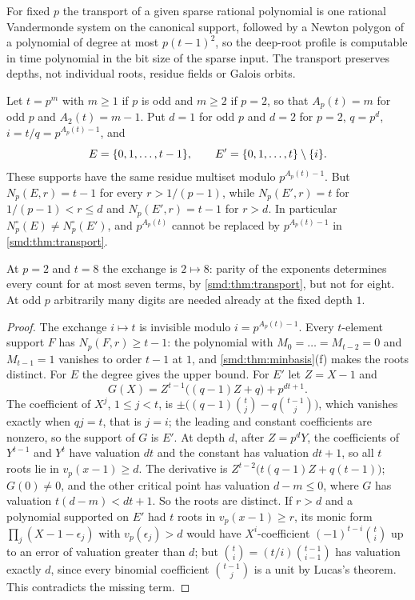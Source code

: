 For fixed $p$ the transport of a given sparse rational polynomial is one rational Vandermonde
system on the canonical support, followed by a Newton polygon of a polynomial of degree at most
$p(t-1)^2$, so the deep-root profile is computable in time polynomial in the bit size of the
sparse input. The transport preserves depths, not individual roots, residue fields or Galois
orbits.

\begin{theorem}\label{smd:thm:digits}
Let $t=p^m$ with $m\ge1$ if $p$ is odd and $m\ge2$ if $p=2$, so that $A_p(t)=m$ for odd $p$ and
$A_2(t)=m-1$. Put $d=1$ for odd $p$ and $d=2$ for $p=2$, $q=p^d$, $i=t/q=p^{A_p(t)-1}$, and
\[
 E=\{0,1,\dots,t-1\},\qquad E'=\{0,1,\dots,t\}\setminus\{i\}.
\]
These supports have the same residue multiset modulo $p^{A_p(t)-1}$. But $N_p(E,r)=t-1$ for every
$r>1/(p-1)$, while $N_p(E',r)=t$ for $1/(p-1)<r\le d$ and $N_p(E',r)=t-1$ for $r>d$. In
particular $N^\circ_p(E)\ne N^\circ_p(E')$, and $p^{A_p(t)}$ cannot be replaced by
$p^{A_p(t)-1}$ in \cref{smd:thm:transport}.
\end{theorem}

At $p=2$ and $t=8$ the exchange is $2\mapsto8$: parity of the exponents determines every count
for at most seven terms, by \cref{smd:thm:transport}, but not for eight. At odd $p$ arbitrarily
many digits are needed already at the fixed depth $1$.

\begin{proof}
The exchange $i\mapsto t$ is invisible modulo $i=p^{A_p(t)-1}$. Every $t$-element support $F$ has
$N_p(F,r)\ge t-1$: the polynomial with $M_0=\dots=M_{t-2}=0$ and $M_{t-1}=1$ vanishes to order
$t-1$ at $1$, and \cref{smd:thm:minbasis}(f) makes the roots distinct. For $E$ the degree gives
the upper bound. For $E'$ let $Z=X-1$ and
\[
 G(X)=Z^{t-1}\bigl((q-1)Z+q\bigr)+p^{dt+1}.
\]
The coefficient of $X^j$, $1\le j<t$, is $\pm\bigl((q-1)\binom tj-q\binom{t-1}j\bigr)$, which
vanishes exactly when $qj=t$, that is $j=i$; the leading and constant coefficients are nonzero,
so the support of $G$ is $E'$. At depth $d$, after $Z=p^dY$, the coefficients of $Y^{t-1}$ and
$Y^t$ have valuation $dt$ and the constant has valuation $dt+1$, so all $t$ roots lie in
$v_p(x-1)\ge d$. The derivative is $Z^{t-2}\bigl(t(q-1)Z+q(t-1)\bigr)$; $G(0)\ne0$, and the other
critical point has valuation $d-m\le0$, where $G$ has valuation $t(d-m)<dt+1$. So the roots are
distinct. If $r>d$ and a polynomial supported on $E'$ had $t$ roots in $v_p(x-1)\ge r$, its
monic form $\prod_j(X-1-\epsilon_j)$ with $v_p(\epsilon_j)>d$ would have $X^i$-coefficient
$(-1)^{t-i}\binom ti$ up to an error of valuation greater than $d$; but
$\binom ti=(t/i)\binom{t-1}{i-1}$ has valuation exactly $d$, since every binomial coefficient
$\binom{t-1}j$ is a unit by Lucas's theorem. This contradicts the missing term.
\end{proof}

